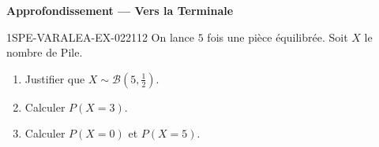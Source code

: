 \begin{center}\textbf{Approfondissement — Vers la Terminale}\end{center}
\begin{exercice}{1SPE-VARALEA-EX-022}{1}{12}
On lance $5$ fois une pièce équilibrée. Soit $X$ le nombre de Pile.

\begin{enumerate}
  \item Justifier que $X \sim \mathcal{B}(5, \frac{1}{2})$.
  \item Calculer $P(X = 3)$.
  \item Calculer $P(X = 0)$ et $P(X = 5)$.
\end{enumerate}
\end{exercice}
